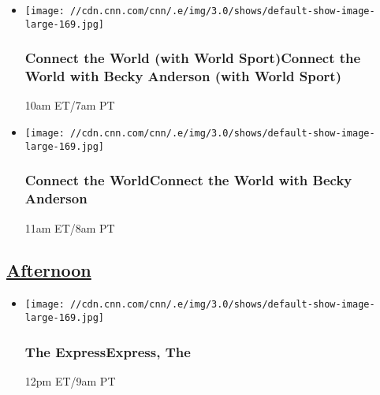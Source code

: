 \begin{itemize}
\item
  \texttt{[image: //cdn.cnn.com/cnn/.e/img/3.0/shows/default-show-image-large-169.jpg]}

  \hypertarget{connect-the-world-with-world-sportconnect-the-world-with-becky-anderson-with-world-sport--3}{%
  \subsubsection{Connect the World (with World Sport)Connect the World
  with Becky Anderson (with World Sport)
  }\label{connect-the-world-with-world-sportconnect-the-world-with-becky-anderson-with-world-sport--3}}

  10am ET/7am PT
\end{itemize}

\begin{itemize}
\item
  \texttt{[image: //cdn.cnn.com/cnn/.e/img/3.0/shows/default-show-image-large-169.jpg]}

  \hypertarget{connect-the-worldconnect-the-world-with-becky-anderson--5}{%
  \subsubsection{Connect the WorldConnect the World with Becky Anderson
  }\label{connect-the-worldconnect-the-world-with-becky-anderson--5}}

  11am ET/8am PT
\end{itemize}

\hypertarget{afternoon--5}{%
\subsection{\texorpdfstring{\href{/tv/schedule/cnn/index.html}{Afternoon}~}{Afternoon~}}\label{afternoon--5}}

\begin{itemize}
\item
  \texttt{[image: //cdn.cnn.com/cnn/.e/img/3.0/shows/default-show-image-large-169.jpg]}

  \hypertarget{the-expressexpress-the--3}{%
  \subsubsection{The ExpressExpress, The
  }\label{the-expressexpress-the--3}}

  12pm ET/9am PT
\end{itemize}

